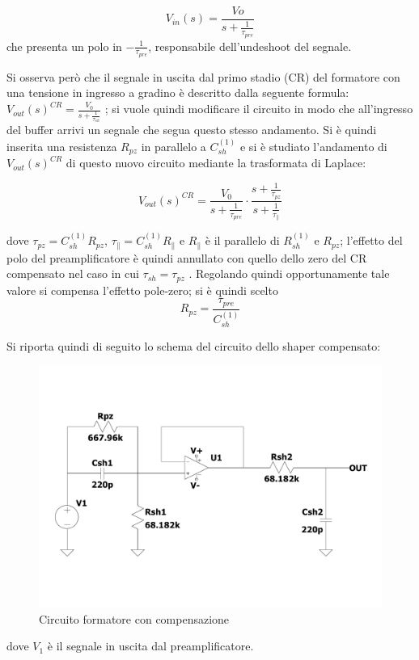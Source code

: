 \documentclass{article}
\begin{document}
\begin{equation}
    V_{in}(s)=\frac{Vo}{s+\frac{1}{\tau_{pre}}}
\end{equation}
che presenta un polo in $-\frac{1}{\tau_{pre}} $,  responsabile dell’undeshoot del segnale.



Si osserva però che il segnale in uscita dal primo stadio (CR) del formatore con una tensione in ingresso a gradino è descritto dalla seguente formula: 
$V_{out}(s)^{CR}=\frac{V_{0}}{s+\frac{1}{\tau_{sh}}}$
;
si vuole quindi modificare il circuito in modo che all'ingresso del buffer arrivi un segnale che segua questo stesso andamento.
Si è quindi inserita una resistenza $R_{pz}$ in parallelo a $C_{sh}^{(1)}$ e si è studiato l'andamento di $ V_{out}(s)^{CR}$ di questo nuovo circuito mediante la trasformata di Laplace:


\begin{equation}
    V_{out}(s)^{CR}=\frac{V_{0}}{s+\frac{1}{\tau_{pre}}}\cdot \frac{s+\frac{1}{\tau_{pz}}}{s+\frac{1}{\tau_{\parallel}}}
\end{equation}


dove $\tau_{pz}= C_{sh}^{(1)}R_{pz}$, $\tau_{\parallel}= C_{sh}^{(1)}R_{\parallel}$ e $R_{\parallel}$ è il parallelo di $R_{sh}^{(1)}$ e $R_{pz}$;
l’effetto del polo del preamplificatore è quindi annullato con quello dello zero del CR compensato nel caso in cui $\tau_{sh}=\tau_{pz}$ .
Regolando quindi opportunamente tale valore si compensa l'effetto pole-zero;
 si è quindi scelto 
$$R_{pz}= \frac{\tau_{pre}}{C_{sh}^{(1)}}$$



Si riporta quindi di seguito lo schema del circuito dello shaper compensato:
 
\begin{center}
    \begin{figure}[H]
    \centering
    \includegraphics[scale=0.3, angle=0]{shapercomp.pdf}
    \caption{Circuito formatore con compensazione}
    \label{fig:shaper}
    \end{figure}
\end{center}
dove $V_1$ è il segnale in uscita dal preamplificatore.
\end{document}
